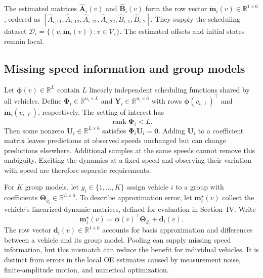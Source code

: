 \documentclass[conference]{IEEEtran}
\newcommand{\R}{\mathbb{R}}
\newcommand{\rank}{\operatorname{rank}}
\newcommand{\rev}[1]{\textcolor{revisiongreen}{#1}}
\newcommand{\bs}[1]{\boldsymbol{#1}}
\begin{document}
\rev{The estimated matrices $\widehat{\bs{A}}_i(v)$} and
\rev{$\widehat{\bs{B}}_i(v)$ form} the \rev{row vector
$\widetilde{\bs{m}}_i(v)\in\R^{1\times6}$, ordered as
$[\widehat A_{i,11},\widehat A_{i,12},\widehat A_{i,21},
\widehat A_{i,22},\widehat B_{i,1},\widehat B_{i,2}]$.
They supply} the scheduling dataset
\rev{$\mathcal D_i=\{(v,\widetilde{\bs{m}}_i(v)):v\in\mathcal V_i\}$.
The estimated} offsets and initial states remain local.

\subsection{\rev{Missing speed} information and \rev{group models}}
Let $\bs{\phi}(v)\in\R^L$ contain $L$ linearly independent scheduling
functions shared by all vehicles. Define
$\bs{\Phi}_i\in\R^{n_i\times L}$ and $\bs{Y}_i\in\R^{n_i\times6}$
with rows $\bs{\phi}(v_{i,\ell})^\top$ and
\rev{$\widetilde{\bs{m}}_i(v_{i,\ell})$}, respectively.
The setting of interest has
\begin{equation}
 \rank\bs{\Phi}_i<L.
 \label{eq:local-deficiency}
\end{equation}
\rev{Then some} nonzero $\bs{U}_i\in\R^{L\times6}$ \rev{satisfies}
$\bs{\Phi}_i\bs{U}_i=\bs{0}$. \rev{Adding $\bs{U}_i$ to a} coefficient
\rev{matrix leaves predictions} at observed speeds \rev{unchanged} but can \rev{change
predictions} elsewhere. Additional samples at the same speeds cannot remove
this ambiguity. \rev{Exciting the dynamics at a fixed speed} and \rev{observing their
variation with speed} are therefore separate requirements.

For $K$ \rev{group models}, let $g_i\in\{1,\ldots,K\}$ assign vehicle $i$ to
a group with coefficients $\bs{\Theta}_{g_i}\in\R^{L\times6}$.
\rev{To describe approximation error, let $\bs{m}_i^\star(v)$ collect the
vehicle's linearized dynamic matrices, defined for evaluation in Section~IV}.
Write
\begingroup\color{revisiongreen}
\begin{equation}
 \bs{m}_i^\star(v)=\bs{\phi}(v)^\top\bs{\Theta}_{g_i}+\bs{d}_i(v).
 \label{eq:map}
\end{equation}
\endgroup
\rev{The row vector} $\bs{d}_i(v)\in\R^{1\times6}$ \rev{accounts for} basis
approximation and \rev{differences between a vehicle and its group model.
Pooling} can supply missing \rev{speed information}, but this mismatch \rev{can reduce
the benefit for individual vehicles. It is distinct} from \rev{errors in the}
local \rev{OE estimates caused by measurement noise, finite-amplitude motion,
and numerical optimization}.
\end{document}
